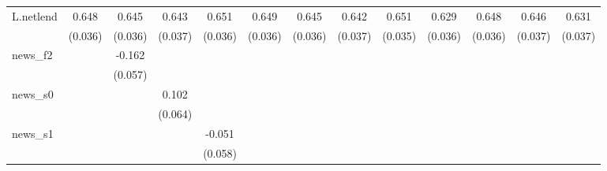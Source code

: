 {\begin{tabular}{l*{12}{c}}
\addlinespace
L.netlend   &       0.648\sym{***}&       0.645\sym{***}&       0.643\sym{***}&       0.651\sym{***}&       0.649\sym{***}&       0.645\sym{***}&       0.642\sym{***}&       0.651\sym{***}&       0.629\sym{***}&       0.648\sym{***}&       0.646\sym{***}&       0.631\sym{***}\\
            &     (0.036)         &     (0.036)         &     (0.037)         &     (0.036)         &     (0.036)         &     (0.036)         &     (0.037)         &     (0.035)         &     (0.036)         &     (0.036)         &     (0.037)         &     (0.037)         \\
\addlinespace
news\_f2     &                     &      -0.162\sym{***}&                     &                     &                     &                     &                     &                     &                     &                     &                     &                     \\
            &                     &     (0.057)         &                     &                     &                     &                     &                     &                     &                     &                     &                     &                     \\
\addlinespace
news\_s0     &                     &                     &       0.102         &                     &                     &                     &                     &                     &                     &                     &                     &                     \\
            &                     &                     &     (0.064)         &                     &                     &                     &                     &                     &                     &                     &                     &                     \\
\addlinespace
news\_s1     &                     &                     &                     &      -0.051         &                     &                     &                     &                     &                     &                     &                     &                     \\
            &                     &                     &                     &     (0.058)         &                     &                     &                     &                     &                     &                     &                     &                     \\

\end{tabular}}
